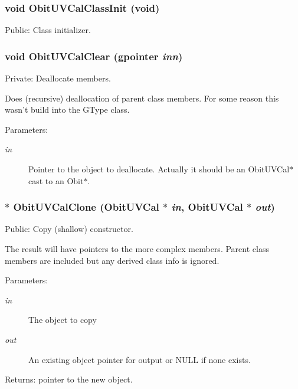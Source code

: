 \subsubsection{\setlength{\rightskip}{0pt plus 5cm}void Obit\-UVCal\-Class\-Init (void)}\label{ObitUVCal_8c_a17}


Public: Class initializer. 

\subsubsection{\setlength{\rightskip}{0pt plus 5cm}void Obit\-UVCal\-Clear (gpointer {\em inn})}\label{ObitUVCal_8c_a4}


Private: Deallocate members. 

Does (recursive) deallocation of parent class members. For some reason this wasn't build into the GType class. \begin{Desc}
\item[Parameters:]
\begin{description}
\item[{\em in}]Pointer to the object to deallocate. Actually it should be an Obit\-UVCal$\ast$ cast to an Obit$\ast$. \end{description}
\end{Desc}
\subsubsection{$\ast$ Obit\-UVCal\-Clone ({\bf Obit\-UVCal} $\ast$ {\em in}, {\bf Obit\-UVCal} $\ast$ {\em out})}\label{ObitUVCal_8c_a11}


Public: Copy (shallow) constructor. 

The result will have pointers to the more complex members. Parent class members are included but any derived class info is ignored. \begin{Desc}
\item[Parameters:]
\begin{description}
\item[{\em in}]The object to copy \item[{\em out}]An existing object pointer for output or NULL if none exists. \end{description}
\end{Desc}
\begin{Desc}
\item[Returns:]pointer to the new object. \end{Desc}
